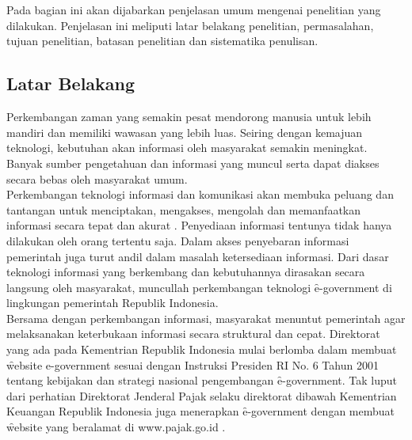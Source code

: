 \chapter{\babSatu}

Pada bagian ini akan dijabarkan penjelasan umum mengenai penelitian yang dilakukan. Penjelasan ini meliputi latar belakang penelitian, permasalahan, tujuan penelitian, batasan penelitian dan sistematika penulisan.

\section{Latar Belakang}
Perkembangan zaman yang semakin pesat mendorong manusia untuk lebih mandiri dan memiliki wawasan yang lebih luas. Seiring dengan kemajuan teknologi, kebutuhan akan informasi oleh masyarakat semakin meningkat. Banyak sumber pengetahuan dan informasi yang muncul serta dapat diakses secara bebas oleh masyarakat umum.
\newline\\
Perkembangan teknologi informasi dan komunikasi akan membuka peluang dan tantangan untuk menciptakan, mengakses, mengolah dan memanfaatkan informasi secara tepat dan akurat \citep{buku.hasibua}. Penyediaan informasi tentunya tidak hanya dilakukan oleh orang tertentu saja. Dalam akses penyebaran informasi pemerintah juga turut andil dalam masalah ketersediaan informasi. Dari dasar teknologi informasi yang berkembang dan kebutuhannya dirasakan secara langsung oleh masyarakat, muncullah perkembangan teknologi \f{e-government} di lingkungan pemerintah Republik Indonesia. 
\newline\\
Bersama dengan perkembangan informasi, masyarakat menuntut pemerintah agar melaksanakan keterbukaan informasi secara struktural dan cepat. Direktorat yang ada pada Kementrian Republik Indonesia mulai berlomba dalam membuat \f{website e-government} sesuai dengan Instruksi Presiden RI No. 6 Tahun 2001 tentang kebijakan dan strategi nasional pengembangan \f{e-government}. Tak luput dari perhatian Direktorat Jenderal Pajak selaku direktorat dibawah Kementrian Keuangan Republik Indonesia juga menerapkan \f{e-government} dengan membuat \f{website} yang beralamat di www.pajak.go.id . 
